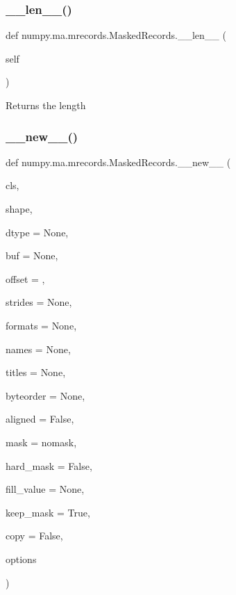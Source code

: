 \subsubsection{\texorpdfstring{\+\_\+\+\_\+len\+\_\+\+\_\+()}{\_\_len\_\_()}}
{\footnotesize\ttfamily def numpy.\+ma.\+mrecords.\+Masked\+Records.\+\_\+\+\_\+len\+\_\+\+\_\+ (\begin{DoxyParamCaption}\item[{}]{self }\end{DoxyParamCaption})}

\begin{DoxyVerb}Returns the length\end{DoxyVerb}
 \mbox{\label{classnumpy_1_1ma_1_1mrecords_1_1MaskedRecords_a50fb676c5bd430ed2627afe5c83bb109}} 
\subsubsection{\texorpdfstring{\+\_\+\+\_\+new\+\_\+\+\_\+()}{\_\_new\_\_()}}
{\footnotesize\ttfamily def numpy.\+ma.\+mrecords.\+Masked\+Records.\+\_\+\+\_\+new\+\_\+\+\_\+ (\begin{DoxyParamCaption}\item[{}]{cls,  }\item[{}]{shape,  }\item[{}]{dtype = {\ttfamily None},  }\item[{}]{buf = {\ttfamily None},  }\item[{}]{offset = {},  }\item[{}]{strides = {\ttfamily None},  }\item[{}]{formats = {\ttfamily None},  }\item[{}]{names = {\ttfamily None},  }\item[{}]{titles = {\ttfamily None},  }\item[{}]{byteorder = {\ttfamily None},  }\item[{}]{aligned = {\ttfamily False},  }\item[{}]{mask = {\ttfamily nomask},  }\item[{}]{hard\+\_\+mask = {\ttfamily False},  }\item[{}]{fill\+\_\+value = {\ttfamily None},  }\item[{}]{keep\+\_\+mask = {\ttfamily True},  }\item[{}]{copy = {\ttfamily False},  }\item[{}]{options }\end{DoxyParamCaption})}

